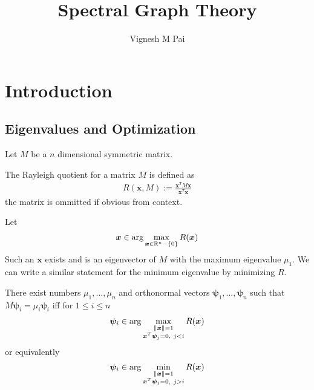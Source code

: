 \documentclass{math}
\title{Spectral Graph Theory}
\author{Vignesh M Pai}
\date{}
\renewcommand{\vec}[1]{\boldsymbol{#1}}
\begin{document}
\maketitle

\tableofcontents

\section{Introduction}

\subsection{Eigenvalues and Optimization}

Let $M$ be a $n$ dimensional symmetric matrix.

\begin{definition}
    The Rayleigh quotient for a matrix $M$ is defined as
    \begin{align*}
        R(\vec{x}, M) := \frac{\vec{x}^T M \vec{x}}{\vec{x}^T \vec{x}}
    \end{align*}
    the matrix is ommitted if obvious from context.
\end{definition}

\begin{theorem}
    Let
    \begin{align*}
        \vec{x} \in \arg \max_{\vec{x} \in \mathbb{R}^n - \set{0}} R(\vec{x})
    \end{align*}
    Such an $\vec{x}$ exists and is an eigenvector of $M$ with the maximum eigenvalue $\mu_1$.
    We can write a similar statement for the minimum eigenvalue by minimizing $R$.
\end{theorem}

\begin{theorem}
    There exist numbers $\mu_1, ..., \mu_n$ and orthonormal vectors $\vec{\psi}_1, ..., \vec{\psi}_n$ such that $M \vec{\psi}_i = \mu_i \vec{\psi}_i$
    iff for $1 \leq i \leq n$
    \begin{align*}
        \vec{\psi}_i \in \arg \max_{\substack{\norm{\vec{x}} = 1 \\ \vec{x}^T \vec{\psi}_j = 0,\ j < i}} R(\vec{x})
    \end{align*}
    or equivalently
    \begin{align*}
        \vec{\psi}_i \in \arg \min_{\substack{\norm{\vec{x}} = 1 \\ \vec{x}^T \vec{\psi}_j = 0,\ j > i}} R(\vec{x})
    \end{align*}
\end{theorem}
\end{document}
